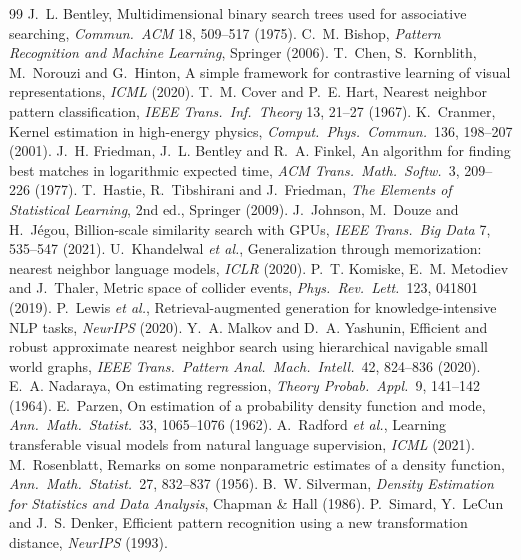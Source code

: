 \documentclass[11pt]{article}
\begin{document}
\begin{thebibliography}{99}\small
{} J.~L. Bentley, Multidimensional binary search trees used for associative searching, \emph{Commun.\ ACM} 18, 509--517 (1975).
 C.~M. Bishop, \emph{Pattern Recognition and Machine Learning}, Springer (2006).
 T.~Chen, S.~Kornblith, M.~Norouzi and G.~Hinton, A simple framework for contrastive learning of visual representations, \emph{ICML} (2020).
 T.~M. Cover and P.~E. Hart, Nearest neighbor pattern classification, \emph{IEEE Trans.\ Inf.\ Theory} 13, 21--27 (1967).
 K.~Cranmer, Kernel estimation in high-energy physics, \emph{Comput.\ Phys.\ Commun.}\ 136, 198--207 (2001).
 J.~H. Friedman, J.~L. Bentley and R.~A. Finkel, An algorithm for finding best matches in logarithmic expected time, \emph{ACM Trans.\ Math.\ Softw.}\ 3, 209--226 (1977).
 T.~Hastie, R.~Tibshirani and J.~Friedman, \emph{The Elements of Statistical Learning}, 2nd ed., Springer (2009).
 J.~Johnson, M.~Douze and H.~Jégou, Billion-scale similarity search with GPUs, \emph{IEEE Trans.\ Big Data} 7, 535--547 (2021).
 U.~Khandelwal \emph{et al.}, Generalization through memorization: nearest neighbor language models, \emph{ICLR} (2020).
 P.~T. Komiske, E.~M. Metodiev and J.~Thaler, Metric space of collider events, \emph{Phys.\ Rev.\ Lett.}\ 123, 041801 (2019).
 P.~Lewis \emph{et al.}, Retrieval-augmented generation for knowledge-intensive NLP tasks, \emph{NeurIPS} (2020).
 Y.~A. Malkov and D.~A. Yashunin, Efficient and robust approximate nearest neighbor search using hierarchical navigable small world graphs, \emph{IEEE Trans.\ Pattern Anal.\ Mach.\ Intell.}\ 42, 824--836 (2020).
 E.~A. Nadaraya, On estimating regression, \emph{Theory Probab.\ Appl.}\ 9, 141--142 (1964).
 E.~Parzen, On estimation of a probability density function and mode, \emph{Ann.\ Math.\ Statist.}\ 33, 1065--1076 (1962).
 A.~Radford \emph{et al.}, Learning transferable visual models from natural language supervision, \emph{ICML} (2021).
 M.~Rosenblatt, Remarks on some nonparametric estimates of a density function, \emph{Ann.\ Math.\ Statist.}\ 27, 832--837 (1956).
 B.~W. Silverman, \emph{Density Estimation for Statistics and Data Analysis}, Chapman \& Hall (1986).
 P.~Simard, Y.~LeCun and J.~S. Denker, Efficient pattern recognition using a new transformation distance, \emph{NeurIPS} (1993).

\end{thebibliography}
\end{document}
